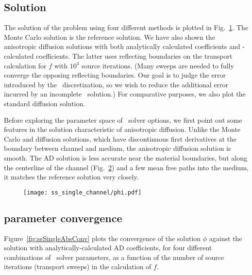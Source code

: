 \subsection{Solution}
The solution of the problem using four different methods is plotted in
Fig.~\ref{fig:ssSingleContour}. The Monte Carlo solution is the reference
solution.  We have also shown the anisotropic diffusion solutions with
both analytically calculated coefficients and \SN-calculated coefficients. The
latter uses reflecting boundaries on the transport calculation for $f$ with
$10^4$ source iterations. (Many sweeps are needed to fully converge the
opposing reflecting boundaries. Our goal is to judge the error introduced by
the \SN\ discretization, so we wish to reduce the additional error incurred by
an incomplete \SN\ solution.) For comparative purposes, we also plot the
standard
diffusion solution.

Before exploring the parameter space of \SN\ solver options, we first point out
some features in the solution characteristic of anisotropic diffusion. Unlike
the Monte Carlo and diffusion solutions, which have discontinuous first
derivatives at the
boundary between channel and medium, the anisotropic diffusion solution is
smooth. The AD solution is less accurate near the material boundaries, but along
the centerline of the channel (Fig.~\ref{fig:ssSingleCenterline}) and a few mean
free paths into the medium, it matches the reference solution very closely.

\begin{figure}[htb]
  \centering
  \texttt{[image: ss\_single\_channel/phi.pdf]}
  \label{fig:ssSingleContour}
\end{figure}

\begin{figure}[htb]
  \centering
  
  \label{fig:ssSingleCenterline}
\end{figure}

\subsection{\texorpdfstring{\SN}{SN} parameter convergence}
Figure~\ref{fig:ssSingleAbsConv} plots the convergence of the solution $\phi$
against the solution with analytically-calculated AD coefficients, for four
different combinations of \SN\ solver parameters, as a function of the number of
source iterations (transport sweeps) in the calculation of $f$.

